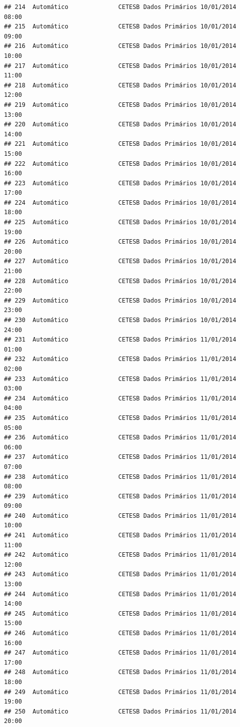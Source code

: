 \documentclass[]{book}
\begin{document}
\begin{verbatim}
## 214  Automático              CETESB Dados Primários 10/01/2014 08:00
## 215  Automático              CETESB Dados Primários 10/01/2014 09:00
## 216  Automático              CETESB Dados Primários 10/01/2014 10:00
## 217  Automático              CETESB Dados Primários 10/01/2014 11:00
## 218  Automático              CETESB Dados Primários 10/01/2014 12:00
## 219  Automático              CETESB Dados Primários 10/01/2014 13:00
## 220  Automático              CETESB Dados Primários 10/01/2014 14:00
## 221  Automático              CETESB Dados Primários 10/01/2014 15:00
## 222  Automático              CETESB Dados Primários 10/01/2014 16:00
## 223  Automático              CETESB Dados Primários 10/01/2014 17:00
## 224  Automático              CETESB Dados Primários 10/01/2014 18:00
## 225  Automático              CETESB Dados Primários 10/01/2014 19:00
## 226  Automático              CETESB Dados Primários 10/01/2014 20:00
## 227  Automático              CETESB Dados Primários 10/01/2014 21:00
## 228  Automático              CETESB Dados Primários 10/01/2014 22:00
## 229  Automático              CETESB Dados Primários 10/01/2014 23:00
## 230  Automático              CETESB Dados Primários 10/01/2014 24:00
## 231  Automático              CETESB Dados Primários 11/01/2014 01:00
## 232  Automático              CETESB Dados Primários 11/01/2014 02:00
## 233  Automático              CETESB Dados Primários 11/01/2014 03:00
## 234  Automático              CETESB Dados Primários 11/01/2014 04:00
## 235  Automático              CETESB Dados Primários 11/01/2014 05:00
## 236  Automático              CETESB Dados Primários 11/01/2014 06:00
## 237  Automático              CETESB Dados Primários 11/01/2014 07:00
## 238  Automático              CETESB Dados Primários 11/01/2014 08:00
## 239  Automático              CETESB Dados Primários 11/01/2014 09:00
## 240  Automático              CETESB Dados Primários 11/01/2014 10:00
## 241  Automático              CETESB Dados Primários 11/01/2014 11:00
## 242  Automático              CETESB Dados Primários 11/01/2014 12:00
## 243  Automático              CETESB Dados Primários 11/01/2014 13:00
## 244  Automático              CETESB Dados Primários 11/01/2014 14:00
## 245  Automático              CETESB Dados Primários 11/01/2014 15:00
## 246  Automático              CETESB Dados Primários 11/01/2014 16:00
## 247  Automático              CETESB Dados Primários 11/01/2014 17:00
## 248  Automático              CETESB Dados Primários 11/01/2014 18:00
## 249  Automático              CETESB Dados Primários 11/01/2014 19:00
## 250  Automático              CETESB Dados Primários 11/01/2014 20:00

\end{verbatim}
\end{document}
